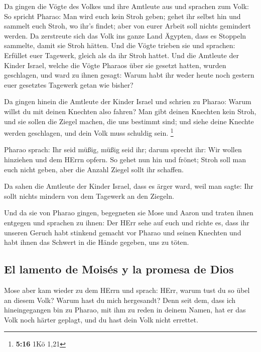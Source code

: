  Da gingen die Vögte des Volkes und ihre Amtleute aus und
sprachen zum Volk: So spricht Pharao: Man wird euch kein Stroh geben;
 gehet ihr selbst hin und sammelt euch Stroh, wo ihr's
findet; aber von eurer Arbeit soll nichts gemindert werden.
 Da zerstreute sich das Volk ins ganze Land Ägypten, dass
es Stoppeln sammelte, damit sie Stroh hätten.  Und die
Vögte trieben sie und sprachen: Erfüllet euer Tagewerk, gleich als da
ihr Stroh hattet.  Und die Amtleute der Kinder Israel,
welche die Vögte Pharaos über sie gesetzt hatten, wurden geschlagen, und
ward zu ihnen gesagt: Warum habt ihr weder heute noch gestern euer
gesetztes Tagewerk getan wie bisher?

 Da gingen hinein die Amtleute der Kinder Israel und
schrien zu Pharao: Warum willst du mit deinen Knechten also fahren?
 Man gibt deinen Knechten kein Stroh, und sie sollen die
Ziegel machen, die uns bestimmt sind; und siehe deine Knechte werden
geschlagen, und dein Volk muss schuldig sein. \footnote{\textbf{5:16}
  1Kö 1,21}

 Pharao sprach: Ihr seid müßig, müßig seid ihr; darum
sprecht ihr: Wir wollen hinziehen und dem HErrn opfern. 
So gehet nun hin und frönet; Stroh soll man euch nicht geben, aber die
Anzahl Ziegel sollt ihr schaffen.

 Da sahen die Amtleute der Kinder Israel, dass es ärger
ward, weil man sagte: Ihr sollt nichts mindern von dem Tagewerk an den
Ziegeln.

 Und da sie von Pharao gingen, begegneten sie Mose und
Aaron und traten ihnen entgegen  und sprachen zu ihnen:
Der HErr sehe auf euch und richte es, dass ihr unseren Geruch habt
stinkend gemacht vor Pharao und seinen Knechten und habt ihnen das
Schwert in die Hände gegeben, uns zu töten.

\hypertarget{el-lamento-de-moisuxe9s-y-la-promesa-de-dios}{%
\subsection{El lamento de Moisés y la promesa de
Dios}\label{el-lamento-de-moisuxe9s-y-la-promesa-de-dios}}

 Mose aber kam wieder zu dem HErrn und sprach: HErr,
warum tust du so übel an diesem Volk? Warum hast du mich hergesandt?
 Denn seit dem, dass ich hineingegangen bin zu Pharao,
mit ihm zu reden in deinem Namen, hat er das Volk noch härter geplagt,
und du hast dein Volk nicht errettet.

